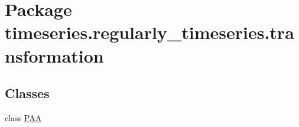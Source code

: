 \hypertarget{namespacetimeseries_1_1regularly__timeseries_1_1transformation}{}\section{Package timeseries.\+regularly\+\_\+timeseries.\+transformation}
\label{namespacetimeseries_1_1regularly__timeseries_1_1transformation}
\subsection*{Classes}
\begin{DoxyCompactItemize}
\item 
class \hyperlink{classtimeseries_1_1regularly__timeseries_1_1transformation_1_1_p_a_a}{P\+A\+A}
\end{DoxyCompactItemize}
